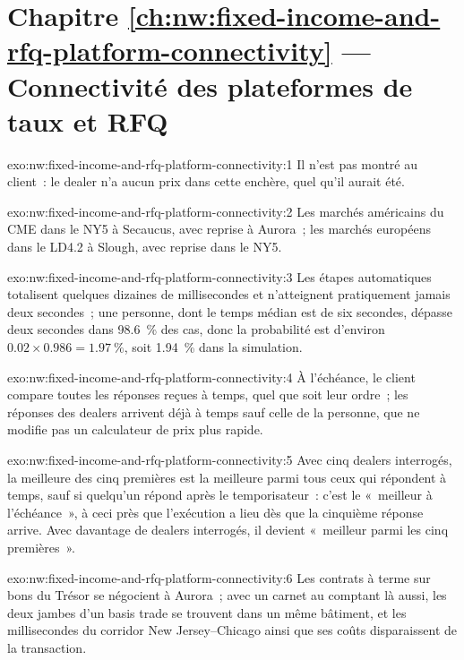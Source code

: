 \section*{Chapitre \ref{ch:nw:fixed-income-and-rfq-platform-connectivity} --- Connectivité des plateformes de taux et RFQ}

\begin{solution}{exo:nw:fixed-income-and-rfq-platform-connectivity:1}
Il n'est pas montré au client~: le dealer n'a aucun prix dans cette enchère, quel qu'il aurait été.
\end{solution}

\begin{solution}{exo:nw:fixed-income-and-rfq-platform-connectivity:2}
Les marchés américains du CME dans le NY5 à Secaucus, avec reprise à Aurora~; les marchés européens dans le LD4.2 à Slough, avec reprise dans le NY5.
\end{solution}

\begin{solution}{exo:nw:fixed-income-and-rfq-platform-connectivity:3}
Les étapes automatiques totalisent quelques dizaines de millisecondes et n'atteignent pratiquement jamais deux secondes~; une personne, dont le temps médian est de six secondes, dépasse
deux secondes dans 98.6~\% des cas, donc la probabilité est d'environ $0.02 \times 0.986 = 1.97~\%$, soit 1.94~\% dans la simulation.
\end{solution}

\begin{solution}{exo:nw:fixed-income-and-rfq-platform-connectivity:4}
À l'échéance, le client compare toutes les réponses reçues à temps, quel que soit leur ordre~; les réponses des dealers arrivent déjà à temps sauf
celle de la personne, que ne modifie pas un calculateur de prix plus rapide.
\end{solution}

\begin{solution}{exo:nw:fixed-income-and-rfq-platform-connectivity:5}
Avec cinq dealers interrogés, la meilleure des cinq premières est la meilleure parmi tous ceux qui répondent à temps, sauf si quelqu'un répond après le temporisateur~: c'est le
«~meilleur à l'échéance~», à ceci près que l'exécution a lieu dès que la cinquième réponse arrive. Avec davantage de dealers interrogés, il devient «~meilleur parmi les
cinq premières~».
\end{solution}

\begin{solution}{exo:nw:fixed-income-and-rfq-platform-connectivity:6}
Les contrats à terme sur bons du Trésor se négocient à Aurora~; avec un carnet au comptant là aussi, les deux jambes d'un basis trade se trouvent dans un même bâtiment, et les millisecondes
du corridor New Jersey--Chicago ainsi que ses coûts disparaissent de la transaction.
\end{solution}

